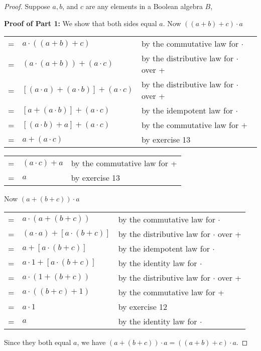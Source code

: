 \documentclass[14pt]{extarticle}
\newcommand{\cy}{\color{cyan}}
\begin{document}
\begin{proof}
  Suppose $a, b$, and $c$ are any elements in a Boolean algebra $B$,

  {\bf Proof of Part 1:} We show that both sides equal $a$.
  Now \(((a + b) + c) \cdot a\)

  \begin{center}
    \begin{tabular}{cll}
      = & \(a \cdot ((a + b) + c)\)                     & {\cy by the commutative law for $\cdot$}         \\
      = & \((a \cdot (a + b)) + (a \cdot c)\)           & {\cy by the distributive law for $\cdot$ over +} \\
      = & \([(a \cdot a) + (a \cdot b)] + (a \cdot c)\) & {\cy by the distributive law for $\cdot$ over +} \\
      = & \([a + (a \cdot b)] + (a \cdot c)\)           & {\cy by the idempotent law for $\cdot$}          \\
      = & \([(a \cdot b) + a] + (a \cdot c)\)           & {\cy by the commutative law for $+$}             \\
      = & \(a + (a \cdot c)\)                           & {\cy by exercise 13}                             \\
    \end{tabular}
  \end{center}
  \begin{center}
    \begin{tabular}{cll}
      = & \((a \cdot c) + a\) & {\cy by the commutative law for +} \\
      = & \(a\)               & {\cy by exercise 13}
    \end{tabular}
  \end{center}

  Now \((a + (b + c)) \cdot a\)

  \begin{center}
    \begin{tabular}{cll}
      = & \(a \cdot (a + (b+c))\)             & {\cy by the commutative law for $\cdot$}         \\
      = & \((a \cdot a) + [a \cdot (b + c)]\) & {\cy by the distributive law for $\cdot$ over +} \\
      = & \(a + [a \cdot (b + c)]\)           & {\cy by the idempotent law for $\cdot$}          \\
      = & \(a \cdot 1 + [a \cdot (b + c)]\)   & {\cy by the identity law for $\cdot$}            \\
      = & \(a \cdot (1 + (b + c))\)           & {\cy by the distributive law for $\cdot$ over +} \\
      = & \(a \cdot ((b + c) + 1)\)           & {\cy by the commutative law for +}               \\
      = & \(a \cdot 1\)                       & {\cy by exercise 12}                             \\
      = & \(a\)                               & {\cy by the identity law for $\cdot$}
    \end{tabular}
  \end{center}
  Since they both equal $a$, we have \((a + (b + c)) \cdot a = ((a + b) + c) \cdot a\).


\end{proof}
\end{document}
